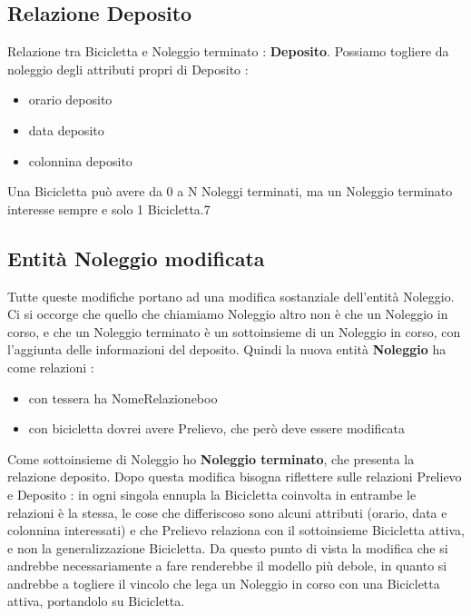 \documentclass[a4paper,twoside]{article}
\begin{document}
\subsection{Relazione Deposito}
Relazione tra Bicicletta e Noleggio terminato : \textbf{Deposito}.\newline
Possiamo togliere da noleggio degli attributi propri di Deposito :
\begin{itemize}
 \item orario deposito
 \item data deposito
 \item colonnina deposito
\end{itemize}
Una Bicicletta può avere da 0 a N Noleggi terminati, ma un Noleggio terminato interesse sempre e solo 1 Bicicletta.7

\subsection{Entità Noleggio modificata}  %
Tutte queste modifiche portano ad una modifica sostanziale dell'entità Noleggio.\newline
Ci si occorge che quello che chiamiamo Noleggio altro non è che un Noleggio in corso, e che un Noleggio terminato è un sottoinsieme di un Noleggio in corso, con l'aggiunta delle informazioni del deposito.
Quindi la nuova entità \textbf{Noleggio} ha come relazioni :
\begin{itemize}
 \item con tessera ha NomeRelazioneboo
 \item con bicicletta dovrei avere Prelievo, che però deve essere modificata
\end{itemize}
Come sottoinsieme di Noleggio ho \textbf{Noleggio terminato}, che presenta la relazione deposito.\newline
Dopo questa modifica bisogna riflettere sulle relazioni Prelievo e Deposito : in ogni singola ennupla la Bicicletta coinvolta in entrambe le relazioni è la stessa, le cose che differiscoso sono alcuni attributi (orario, data e colonnina interessati) e che Prelievo relaziona con il sottoinsieme Bicicletta attiva, e non la generalizzazione Bicicletta.\newline
Da questo punto di vista la  modifica che si andrebbe necessariamente a fare renderebbe il modello più debole, in quanto si andrebbe a togliere il vincolo che lega un Noleggio in corso con una Bicicletta attiva, portandolo su Bicicletta.\newline
\end{document}
